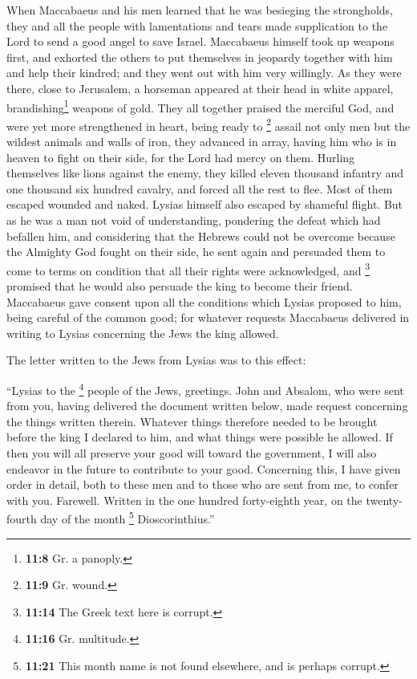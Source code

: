  When Maccabaeus and his men learned that he was besieging
the strongholds, they and all the people with lamentations and tears
made supplication to the Lord to send a good angel to save Israel.
 Maccabaeus himself took up weapons first, and exhorted
the others to put themselves in jeopardy together with him and help
their kindred; and they went out with him very willingly. 
As they were there, close to Jerusalem, a horseman appeared at their
head in white apparel, brandishing\footnote{\textbf{11:8} Gr. a panoply.}
weapons of gold.  They all together praised the merciful
God, and were yet more strengthened in heart, being ready to \footnote{\textbf{11:9}
  Gr. wound.} assail not only men but the wildest animals and walls of
iron,  they advanced in array, having him who is in
heaven to fight on their side, for the Lord had mercy on them.
 Hurling themselves like lions against the enemy, they
killed eleven thousand infantry and one thousand six hundred cavalry,
and forced all the rest to flee.  Most of them escaped
wounded and naked. Lysias himself also escaped by shameful flight.
 But as he was a man not void of understanding, pondering
the defeat which had befallen him, and considering that the Hebrews
could not be overcome because the Almighty God fought on their side, he
sent again  and persuaded them to come to terms on
condition that all their rights were acknowledged, and \footnote{\textbf{11:14}
  The Greek text here is corrupt.} promised that he would also persuade
the king to become their friend.  Maccabaeus gave consent
upon all the conditions which Lysias proposed to him, being careful of
the common good; for whatever requests Maccabaeus delivered in writing
to Lysias concerning the Jews the king allowed.

 The letter written to the Jews from Lysias was to this
effect:

``Lysias to the \footnote{\textbf{11:16} Gr. multitude.} people of the
Jews, greetings.  John and Absalom, who were sent from
you, having delivered the document written below, made request
concerning the things written therein.  Whatever things
therefore needed to be brought before the king I declared to him, and
what things were possible he allowed.  If then you will
all preserve your good will toward the government, I will also endeavor
in the future to contribute to your good.  Concerning
this, I have given order in detail, both to these men and to those who
are sent from me, to confer with you.  Farewell. Written
in the one hundred forty-eighth year, on the twenty-fourth day of the
month \footnote{\textbf{11:21} This month name is not found elsewhere,
  and is perhaps corrupt.} Dioscorinthius.''

